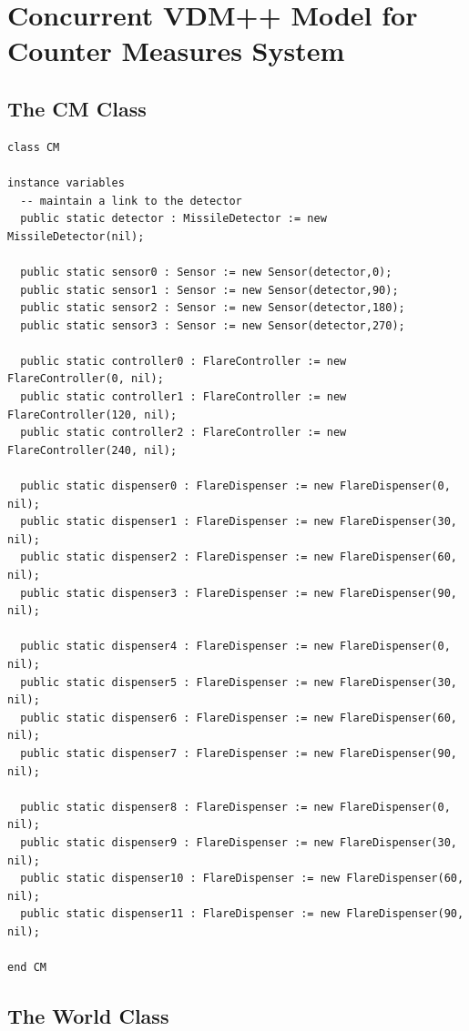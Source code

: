 \documentclass{overturerepchap}
\begin{document}
\section{Concurrent VDM++ Model for Counter Measures System}\label{app:concurCM}
\subsection{The CM Class}

\begin{lstlisting}
class CM

instance variables
  -- maintain a link to the detector
  public static detector : MissileDetector := new MissileDetector(nil);

  public static sensor0 : Sensor := new Sensor(detector,0);
  public static sensor1 : Sensor := new Sensor(detector,90);
  public static sensor2 : Sensor := new Sensor(detector,180);
  public static sensor3 : Sensor := new Sensor(detector,270);

  public static controller0 : FlareController := new FlareController(0, nil);
  public static controller1 : FlareController := new FlareController(120, nil);
  public static controller2 : FlareController := new FlareController(240, nil);

  public static dispenser0 : FlareDispenser := new FlareDispenser(0, nil);
  public static dispenser1 : FlareDispenser := new FlareDispenser(30, nil);
  public static dispenser2 : FlareDispenser := new FlareDispenser(60, nil);
  public static dispenser3 : FlareDispenser := new FlareDispenser(90, nil);

  public static dispenser4 : FlareDispenser := new FlareDispenser(0, nil);
  public static dispenser5 : FlareDispenser := new FlareDispenser(30, nil);
  public static dispenser6 : FlareDispenser := new FlareDispenser(60, nil);
  public static dispenser7 : FlareDispenser := new FlareDispenser(90, nil);

  public static dispenser8 : FlareDispenser := new FlareDispenser(0, nil);
  public static dispenser9 : FlareDispenser := new FlareDispenser(30, nil);
  public static dispenser10 : FlareDispenser := new FlareDispenser(60, nil);
  public static dispenser11 : FlareDispenser := new FlareDispenser(90, nil);

end CM
\end{lstlisting}

\subsection{The World Class}
\end{document}
